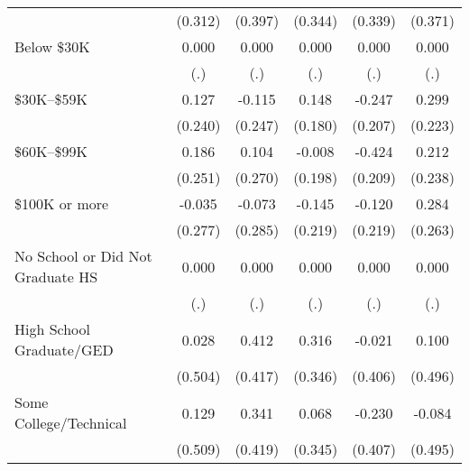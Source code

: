 \begin{table}[htbp]
\begin{tabular}{l*{5}{c}}
                    &     (0.312)         &     (0.397)         &     (0.344)         &     (0.339)         &     (0.371)         \\
Below \$30K         &       0.000         &       0.000         &       0.000         &       0.000         &       0.000         \\
                    &         (.)         &         (.)         &         (.)         &         (.)         &         (.)         \\
\$30K--\$59K        &       0.127         &      -0.115         &       0.148         &      -0.247         &       0.299         \\
                    &     (0.240)         &     (0.247)         &     (0.180)         &     (0.207)         &     (0.223)         \\
\$60K--\$99K        &       0.186         &       0.104         &      -0.008         &      -0.424\sym{**} &       0.212         \\
                    &     (0.251)         &     (0.270)         &     (0.198)         &     (0.209)         &     (0.238)         \\
\$100K or more      &      -0.035         &      -0.073         &      -0.145         &      -0.120         &       0.284         \\
                    &     (0.277)         &     (0.285)         &     (0.219)         &     (0.219)         &     (0.263)         \\
No School or Did Not Graduate HS&       0.000         &       0.000         &       0.000         &       0.000         &       0.000         \\
                    &         (.)         &         (.)         &         (.)         &         (.)         &         (.)         \\
High School Graduate/GED&       0.028         &       0.412         &       0.316         &      -0.021         &       0.100         \\
                    &     (0.504)         &     (0.417)         &     (0.346)         &     (0.406)         &     (0.496)         \\
Some College/Technical&       0.129         &       0.341         &       0.068         &      -0.230         &      -0.084         \\
                    &     (0.509)         &     (0.419)         &     (0.345)         &     (0.407)         &     (0.495)         \\

\end{tabular}
\end{table}
